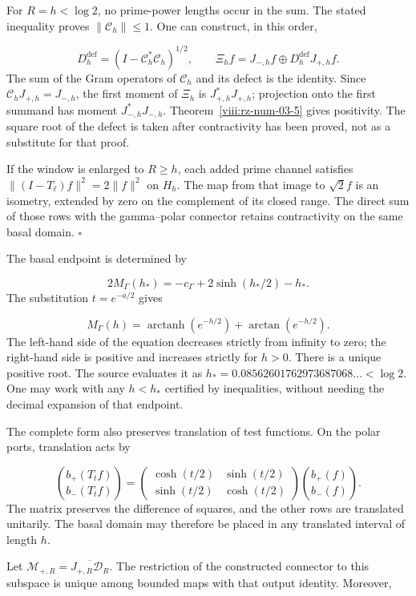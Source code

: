 For \(R=h<\log2\), no prime-power lengths occur in the sum. The stated inequality proves \(\|\mathcal C_h\|\leq1\). One can construct, in this order,

\[
D_h^{\mathrm{def}}=(I-\mathcal C_h^*\mathcal C_h)^{1/2},
\qquad
\Xi_hf=J_{-,h}f\oplus D_h^{\mathrm{def}}J_{+,h}f.
\]
The sum of the Gram operators of \(\mathcal C_h\) and its defect is the identity. Since \(\mathcal C_hJ_{+,h}=J_{-,h}\), the first moment of \(\Xi_h\) is \(J_{+,h}^*J_{+,h}\); projection onto the first summand has moment \(J_{-,h}^*J_{-,h}\). Theorem~\ref{viii:rz-num-03-5} gives positivity. The square root of the defect is taken after contractivity has been proved, not as a substitute for that proof.

If the window is enlarged to \(R\geq h\), each added prime channel satisfies \(\|(I-T_\ell)f\|^2=2\|f\|^2\) on \(H_h\). The map from that image to \(\sqrt2f\) is an isometry, extended by zero on the complement of its closed range. The direct sum of those rows with the gamma–polar connector retains contractivity on the same basal domain. \hfill\(\square\)

The basal endpoint is determined by

\[
2M_\Gamma(h_*)=-c_\Gamma+2\sinh(h_*/2)-h_*.
\]
The substitution \(t=e^{-a/2}\) gives

\[
M_\Gamma(h)=\operatorname{arctanh}(e^{-h/2})
+\arctan(e^{-h/2}).
\]
The left-hand side of the equation decreases strictly from infinity to zero; the right-hand side is positive and increases strictly for \(h>0\). There is a unique positive root. The source evaluates it as \(h_*=0.08562601762973687068\ldots<\log2\). One may work with any \(h<h_*\) certified by inequalities, without needing the decimal expansion of that endpoint.

The complete form also preserves translation of test functions. On the polar ports, translation acts by

\[
\binom{b_+(T_tf)}{b_-(T_tf)}=
\begin{pmatrix}\cosh(t/2)&\sinh(t/2)\\
\sinh(t/2)&\cosh(t/2)\end{pmatrix}
\binom{b_+(f)}{b_-(f)}.
\]
The matrix preserves the difference of squares, and the other rows are translated unitarily. The basal domain may therefore be placed in any translated interval of length \(h\).

Let \(\mathcal M_{+,R}=\overline{J_{+,R}\mathcal D_R}\). The restriction of the constructed connector to this subspace is unique among bounded maps with that output identity. Moreover,

